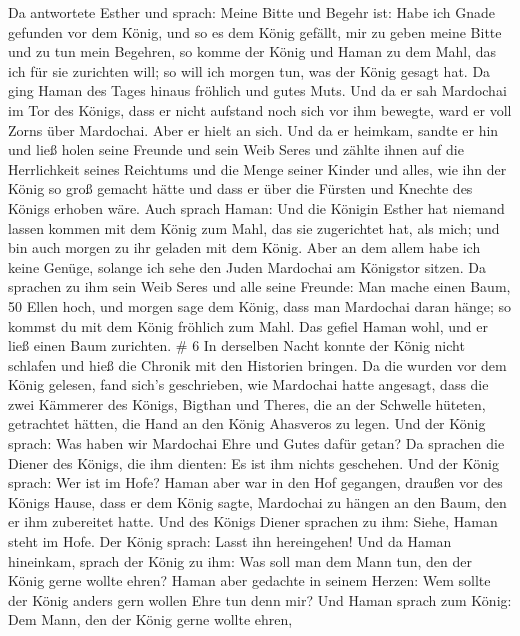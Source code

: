  Da antwortete Esther und sprach: Meine Bitte und Begehr
ist:  Habe ich Gnade gefunden vor dem König, und so es dem
König gefällt, mir zu geben meine Bitte und zu tun mein Begehren, so
komme der König und Haman zu dem Mahl, das ich für sie zurichten will;
so will ich morgen tun, was der König gesagt hat.  Da ging
Haman des Tages hinaus fröhlich und gutes Muts. Und da er sah Mardochai
im Tor des Königs, dass er nicht aufstand noch sich vor ihm bewegte,
ward er voll Zorns über Mardochai.  Aber er hielt an sich.
Und da er heimkam, sandte er hin und ließ holen seine Freunde und sein
Weib Seres  und zählte ihnen auf die Herrlichkeit seines
Reichtums und die Menge seiner Kinder und alles, wie ihn der König so
groß gemacht hätte und dass er über die Fürsten und Knechte des Königs
erhoben wäre.  Auch sprach Haman: Und die Königin Esther
hat niemand lassen kommen mit dem König zum Mahl, das sie zugerichtet
hat, als mich; und bin auch morgen zu ihr geladen mit dem König.
 Aber an dem allem habe ich keine Genüge, solange ich sehe
den Juden Mardochai am Königstor sitzen.  Da sprachen zu
ihm sein Weib Seres und alle seine Freunde: Man mache einen Baum, 50
Ellen hoch, und morgen sage dem König, dass man Mardochai daran hänge;
so kommst du mit dem König fröhlich zum Mahl. Das gefiel Haman wohl, und
er ließ einen Baum zurichten. \# 6  In derselben Nacht
konnte der König nicht schlafen und hieß die Chronik mit den Historien
bringen. Da die wurden vor dem König gelesen,  fand sich's
geschrieben, wie Mardochai hatte angesagt, dass die zwei Kämmerer des
Königs, Bigthan und Theres, die an der Schwelle hüteten, getrachtet
hätten, die Hand an den König Ahasveros zu legen.  Und der
König sprach: Was haben wir Mardochai Ehre und Gutes dafür getan? Da
sprachen die Diener des Königs, die ihm dienten: Es ist ihm nichts
geschehen.  Und der König sprach: Wer ist im Hofe? Haman
aber war in den Hof gegangen, draußen vor des Königs Hause, dass er dem
König sagte, Mardochai zu hängen an den Baum, den er ihm zubereitet
hatte.  Und des Königs Diener sprachen zu ihm: Siehe, Haman
steht im Hofe. Der König sprach: Lasst ihn hereingehen!  Und
da Haman hineinkam, sprach der König zu ihm: Was soll man dem Mann tun,
den der König gerne wollte ehren? Haman aber gedachte in seinem Herzen:
Wem sollte der König anders gern wollen Ehre tun denn mir? 
Und Haman sprach zum König: Dem Mann, den der König gerne wollte ehren,
